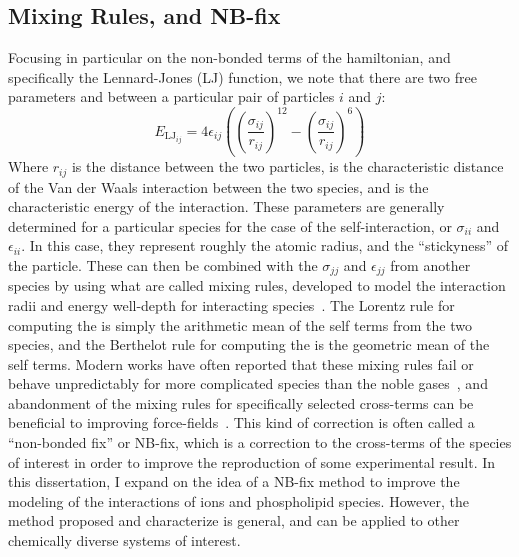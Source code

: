 \subsection{Mixing Rules, and NB-fix}
Focusing in particular on the non-bonded terms of the hamiltonian, and specifically the Lennard-Jones (LJ) function, we note that there are two
free parameters \sigmaij{} and \epsilonij{} between a particular pair of particles $i$ and $j$:
\begin{equation}
E_{\mathrm{LJ}_{ij}} = 4\epsilon_{ij} \left( \left( \frac{\sigma_{ij}}{r_{ij}} \right)^{12}
- \left( \frac{\sigma_{ij}}{r_{ij}} \right)^{6} \right)
\end{equation}
Where $r_{ij}$ is the distance between the two particles, \sigmaij{} is the characteristic distance of the Van der Waals interaction between the two species,
and \epsilonij{} is the characteristic energy of the interaction.
These parameters are generally determined for a particular species for the case of the self-interaction, or $\sigma_{ii}$ and $\epsilon_{ii}$.
In this case, they represent roughly the atomic radius, and the ``stickyness'' of the particle. These can then be combined with the 
$\sigma_{jj}$ and $\epsilon_{jj}$ from another species by using what are called mixing rules, developed to 
model the interaction radii and energy well-depth for interacting species~\cite{lorentz:1881,berthelot:1898}.
The Lorentz rule for computing the \sigmaij{} is simply the arithmetic mean of the self terms from the two species, and 
the Berthelot rule for computing the \epsilonij{} is the geometric mean of the self terms.
Modern works have often reported that these mixing rules fail
or behave unpredictably for more complicated species than the noble gases~\cite{fyta:2012,boda:2008:effects},
and abandonment of the mixing rules for specifically selected cross-terms can be beneficial to improving
force-fields~\cite{baker:2010:accurate,yoo:2012:improved,fyta:2012:ionic,mamatkulov:2013:force,venable:2013,
savelyev:2014:balancing,li:2015:representation,savelyev:2015:competition,jing:2017:study,reif:2017,wineman:2019}. This 
kind of correction is often called a ``non-bonded fix'' or NB-fix, which is a correction to the cross-terms of the species of interest 
in order to improve the reproduction of some experimental result.
In this dissertation, I expand on the idea of a NB-fix method to improve the modeling of the interactions of ions and phospholipid species.
However, the method proposed and characterize is general, and can be applied to other chemically diverse systems of interest.

